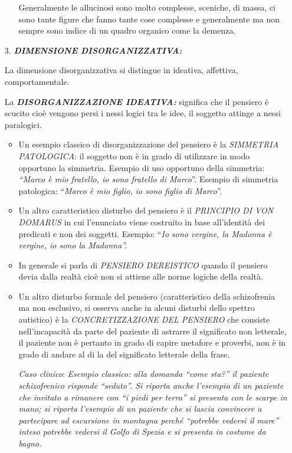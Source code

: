 \begin{itemize}
\begin{itemize}
Generalmente le allucinosi sono molto complesse, sceniche, di massa, ci
sono tante figure che fanno tante cose complesse e generalmente ma non
sempre sono indice di un quadro organico come la demenza.
\end{itemize}

\item[3.]
  \textbf{\emph{DIMENSIONE DISORGANIZZATIVA:}}

La dimensione disorganizzativa si distingue in ideativa, affettiva,
comportamentale.

La \textbf{\emph{DISORGANIZZAZIONE IDEATIVA:}} significa che il pensiero
è scucito cioè vengono persi i nessi logici tra le idee, il soggetto
attinge a nessi paralogici.

\begin{itemize}
\item
  Un esempio classico di disorganizzazione del pensiero è la
  \emph{SIMMETRIA PATOLOGICA}: il soggetto non è in grado di utilizzare
  in modo opportuno la simmetria. Esempio di uso opportuno della
  simmetria: \emph{``Marco è mio fratello, io sono fratello di Marco}''.
  Esempio di simmetria patologica: ``\emph{Marco è mio figlio, io sono
  figlio di Marco}''.
\item
  Un altro caratteristico disturbo del pensiero è il \emph{PRINCIPIO DI
  VON DOMARUS} in cui l'enunciato viene costruito in base all'identità
  dei predicati e non dei soggetti. Esempio: ``\emph{Io sono vergine, la
  Madonna è vergine, io sono la Madonna''. }
\item
  In generale si parla di \emph{PENSIERO DEREISTICO} quando il pensiero
  devia dalla realtà cioè non si attiene alle norme logiche della
  realtà.
\item
  Un altro disturbo formale del pensiero (caratteristico della
  schizofrenia ma non esclusivo, si osserva anche in alcuni disturbi
  dello spettro autistico) è la \emph{CONCRETIZZAZIONE DEL PENSIERO} che
  consiste nell'incapacità da parte del paziente di astrarre il
  significato non letterale, il paziente non è pertanto in grado di
  capire metafore e proverbi, non è in grado di andare al di la del
  significato letterale della frase.

\emph{Caso clinico}: \emph{Esempio classico: alla domanda ``come sta?''
il paziente schizofrenico risponde ``seduto''. Si riporta anche
l'esempio di un paziente che invitato a rimanere con ``i piedi per
terra'' si presenta con le scarpe in mano; si riporta l'esempio di un
paziente che si lascia convincere a partecipare ad escursione in
montagna perché ``potrebbe vedersi il mare'' inteso potrebbe vedersi il
Golfo di Spezia e si presenta in costume da bagno. }


\end{itemize}
\end{itemize}
